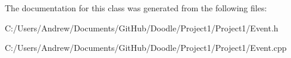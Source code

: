 The documentation for this class was generated from the following files\+:\begin{DoxyCompactItemize}
\item 
C\+:/\+Users/\+Andrew/\+Documents/\+Git\+Hub/\+Doodle/\+Project1/\+Project1/Event.\+h\item 
C\+:/\+Users/\+Andrew/\+Documents/\+Git\+Hub/\+Doodle/\+Project1/\+Project1/Event.\+cpp\end{DoxyCompactItemize}
